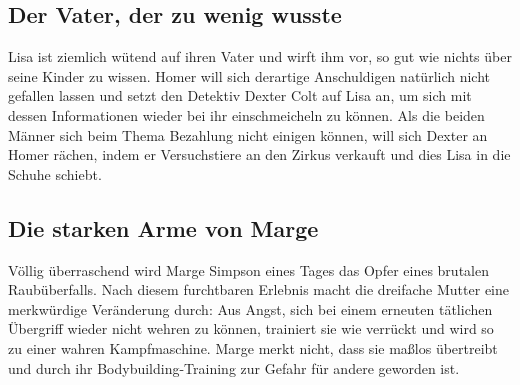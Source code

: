 \subsection{Der Vater, der zu wenig wusste}\label{EABF03}
Lisa ist ziemlich wütend auf ihren Vater und wirft ihm vor, so gut wie nichts über seine Kinder zu wissen. Homer will sich derartige Anschuldigen natürlich nicht gefallen lassen und setzt den Detektiv Dexter Colt auf Lisa an, um sich mit dessen Informationen wieder bei ihr einschmeicheln zu können. Als die beiden Männer sich beim Thema Bezahlung nicht einigen können, will sich Dexter an Homer rächen, indem er Versuchstiere an den Zirkus verkauft und dies Lisa in die Schuhe schiebt.


\subsection{Die starken Arme von Marge}
Völlig überraschend wird Marge Simpson eines Tages das Opfer eines brutalen Raubüberfalls. Nach diesem furchtbaren Erlebnis macht die dreifache Mutter eine merkwürdige Veränderung durch: Aus Angst, sich bei einem erneuten tätlichen Übergriff wieder nicht wehren zu können, trainiert sie wie verrückt und wird so zu einer wahren Kampfmaschine. Marge merkt nicht, dass sie maßlos übertreibt und durch ihr Bodybuilding-Training zur Gefahr für andere geworden ist.



